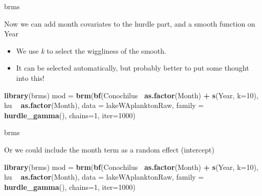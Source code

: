 \documentclass[ignorenonframetext,]{beamer}
\newenvironment{Shaded}{\begin{snugshade}}{\end{snugshade}}
\newcommand{\DataTypeTok}[1]{\textcolor[rgb]{0.13,0.29,0.53}{#1}}
\newcommand{\DecValTok}[1]{\textcolor[rgb]{0.00,0.00,0.81}{#1}}
\newcommand{\KeywordTok}[1]{\textcolor[rgb]{0.13,0.29,0.53}{\textbf{#1}}}
\newcommand{\NormalTok}[1]{#1}
\newcommand{\OperatorTok}[1]{\textcolor[rgb]{0.81,0.36,0.00}{\textbf{#1}}}
\newcommand{\StringTok}[1]{\textcolor[rgb]{0.31,0.60,0.02}{#1}}
\providecommand{\tightlist}{%
  \setlength{\itemsep}{0pt}\setlength{\parskip}{0pt}}
\begin{document}
\begin{frame}[fragile]{brms}
\protect\hypertarget{brms-1}{}

Now we can add month covariates to the hurdle part, and a smooth
function on Year

\begin{itemize}
\tightlist
\item
  We use \emph{k} to select the wiggliness of the smooth.
\item
  It can be selected automatically, but probably better to put some
  thought into this!
\end{itemize}

\begin{Shaded}
\begin{Highlighting}[]
\KeywordTok{library}\NormalTok{(brms)}
\NormalTok{mod =}\StringTok{ }\KeywordTok{brm}\NormalTok{(}\KeywordTok{bf}\NormalTok{(Conochilus}\OperatorTok{~}\StringTok{ }\KeywordTok{as.factor}\NormalTok{(Month) }\OperatorTok{+}\StringTok{ }\KeywordTok{s}\NormalTok{(Year, }\DataTypeTok{k=}\DecValTok{10}\NormalTok{), }
\NormalTok{       hu }\OperatorTok{~}\StringTok{ }\KeywordTok{as.factor}\NormalTok{(Month), }
      \DataTypeTok{data =}\NormalTok{ lakeWAplanktonRaw, }\DataTypeTok{family =} \KeywordTok{hurdle_gamma}\NormalTok{(), }
        \DataTypeTok{chains=}\DecValTok{1}\NormalTok{, }\DataTypeTok{iter=}\DecValTok{1000}\NormalTok{)}
\end{Highlighting}
\end{Shaded}

\end{frame}

\begin{frame}[fragile]{brms}
\protect\hypertarget{brms-2}{}

Or we could include the month term as a random effect (intercept)

\begin{Shaded}
\begin{Highlighting}[]
\KeywordTok{library}\NormalTok{(brms)}
\NormalTok{mod =}\StringTok{ }\KeywordTok{brm}\NormalTok{(}\KeywordTok{bf}\NormalTok{(Conochilus}\OperatorTok{~}\StringTok{ }\KeywordTok{as.factor}\NormalTok{(Month) }\OperatorTok{+}\StringTok{ }\KeywordTok{s}\NormalTok{(Year, }\DataTypeTok{k=}\DecValTok{10}\NormalTok{), }
\NormalTok{       hu }\OperatorTok{~}\StringTok{ }\KeywordTok{as.factor}\NormalTok{(Month), }
      \DataTypeTok{data =}\NormalTok{ lakeWAplanktonRaw, }\DataTypeTok{family =} \KeywordTok{hurdle_gamma}\NormalTok{(), }
        \DataTypeTok{chains=}\DecValTok{1}\NormalTok{, }\DataTypeTok{iter=}\DecValTok{1000}\NormalTok{)}
\end{Highlighting}
\end{Shaded}

\end{frame}
\end{document}
